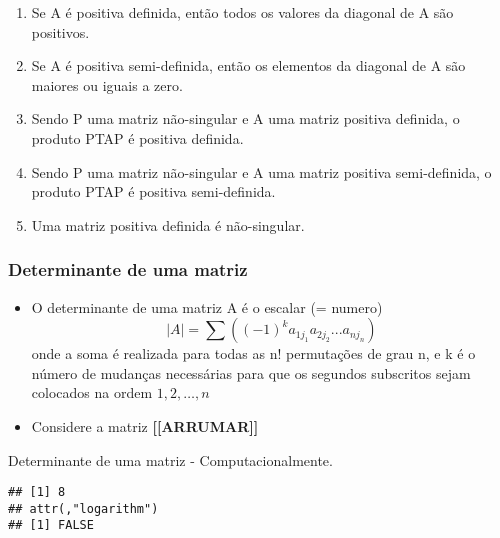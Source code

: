 \documentclass[
]{article}
\newenvironment{Shaded}{\begin{snugshade}}{\end{snugshade}}
\newcommand{\AttributeTok}[1]{\textcolor[rgb]{0.13,0.29,0.53}{#1}}
\newcommand{\ConstantTok}[1]{\textcolor[rgb]{0.56,0.35,0.01}{#1}}
\newcommand{\DecValTok}[1]{\textcolor[rgb]{0.00,0.00,0.81}{#1}}
\newcommand{\FunctionTok}[1]{\textcolor[rgb]{0.13,0.29,0.53}{\textbf{#1}}}
\newcommand{\NormalTok}[1]{#1}
\newcommand{\OtherTok}[1]{\textcolor[rgb]{0.56,0.35,0.01}{#1}}
\newcommand{\SpecialCharTok}[1]{\textcolor[rgb]{0.81,0.36,0.00}{\textbf{#1}}}
\providecommand{\tightlist}{%
  \setlength{\itemsep}{0pt}\setlength{\parskip}{0pt}}
\begin{document}
\begin{enumerate}
\def\labelenumi{\arabic{enumi}.}
\tightlist
\item
  Se A é positiva definida, então todos os valores da diagonal de A são
  positivos.
\item
  Se A é positiva semi-definida, então os elementos da diagonal de A são
  maiores ou iguais a zero.
\item
  Sendo P uma matriz não-singular e A uma matriz positiva definida, o
  produto PTAP é positiva definida.
\item
  Sendo P uma matriz não-singular e A uma matriz positiva semi-definida,
  o produto PTAP é positiva semi-definida.
\item
  Uma matriz positiva definida é não-singular.
\end{enumerate}

\hypertarget{determinante-de-uma-matriz}{%
\subsubsection{Determinante de uma
matriz}\label{determinante-de-uma-matriz}}

\begin{itemize}
\item
  O determinante de uma matriz A é o escalar (= numero) \[
  |A| = \sum((-1)^k a_{1j_{1}} a_{2j_{2}} ... a_{nj_{n}})
  \] onde a soma é realizada para todas as n! permutações de grau n, e k
  é o número de mudanças necessárias para que os segundos subscritos
  sejam colocados na ordem \(1,2, … , n\)
\item
  Considere a matriz \textbf{{[}{[}ARRUMAR{]}{]}}
\end{itemize}

Determinante de uma matriz - Computacionalmente.

\begin{Shaded}
\end{Shaded}

\begin{verbatim}
## [1] 8
## attr(,"logarithm")
## [1] FALSE
\end{verbatim}
\end{document}
